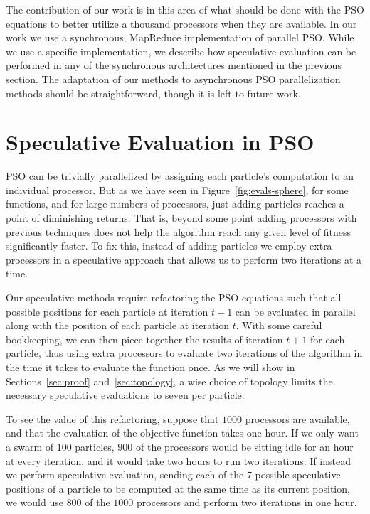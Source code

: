 \documentclass[ms,electronic,twosidetoc,letterpaper,chaptercenter,parttop,equalmargins]{byumsphd}
\newcommand{\fig}[1]{Figure~\ref{fig:#1}}
\begin{document}
The contribution of our work is in this area of what should be done with the
PSO equations to better utilize a thousand processors when they are available.
In our work we use a synchronous, MapReduce implementation of parallel PSO.
While we use a specific implementation, we describe how speculative evaluation
can be performed in any of the synchronous architectures mentioned in the
previous section.  The adaptation of our methods to asynchronous PSO
parallelization methods should be straightforward, though it is left to future
work.

\chapter{Speculative Evaluation in PSO}
\label{sec:sepso}

PSO can be trivially parallelized by assigning each particle's computation to
an individual processor.  But as we have seen in \fig{evals-sphere}, for some
functions, and for large numbers of processors, just adding particles reaches a
point of diminishing returns.  That is, beyond some point adding processors
with previous techniques does not help the algorithm reach any given level of
fitness significantly faster.  To fix this, instead of adding particles we
employ extra processors in a speculative approach that allows us to perform two
iterations at a time.

Our speculative methods require refactoring the PSO equations such that all
possible positions for each particle at iteration $t+1$ can be evaluated in
parallel along with the position of each particle at iteration $t$.  With some
careful bookkeeping, we can then piece together the results of iteration $t+1$
for each particle, thus using extra processors to evaluate two iterations of
the algorithm in the time it takes to evaluate the function once.  As we will
show in Sections~\ref{sec:proof} and~\ref{sec:topology}, a wise choice of
topology limits the necessary speculative evaluations to seven per particle.

To see the value of this refactoring, suppose that $1000$ processors are
available, and that the evaluation of the objective function takes one hour.
If we only want a swarm of $100$ particles, $900$ of the processors would be
sitting idle for an hour at every iteration, and it would take two hours to run
two iterations.  If instead we perform speculative evaluation, sending each of
the $7$ possible speculative positions of a particle to be computed at the same
time as its current position, we would use $800$ of the $1000$ processors and
perform two iterations in one hour.
\end{document}
